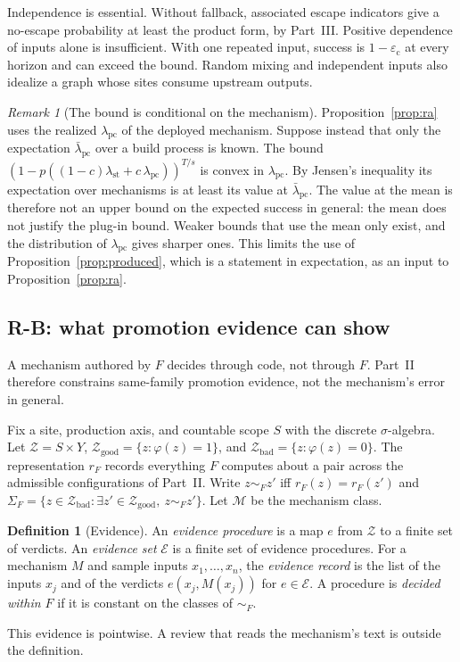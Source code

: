 \documentclass[11pt]{article}
\theoremstyle{definition}
\newtheorem{definition}{Definition}
\theoremstyle{remark}
\newtheorem{remark}{Remark}
\newcommand{\lst}{\lambda_{\mathrm{st}}}
\newcommand{\simF}{\sim_F}
\newcommand{\SigF}{\Sigma_F}
\newcommand{\lpc}{\lambda_{\mathrm{pc}}}
\newcommand{\ecl}{\varepsilon_{\mathrm{c}}}
\newcommand{\Z}{\mathcal{Z}}
\newcommand{\Zgood}{\mathcal{Z}_{\mathrm{good}}}
\newcommand{\Zbad}{\mathcal{Z}_{\mathrm{bad}}}
\newcommand{\Mclass}{\mathcal{M}}
\begin{document}
Independence is essential. Without fallback, associated escape indicators give a no-escape
probability at least the product form, by Part~III. Positive dependence of inputs alone is
insufficient. With one repeated input, success is $1-\ecl$ at every horizon and can exceed the
bound. Random mixing and independent inputs also idealize a graph whose sites consume upstream
outputs.

\begin{remark}[The bound is conditional on the mechanism]\label{rem:jensen}
Proposition~\ref{prop:ra} uses the realized $\lpc$ of the deployed mechanism. Suppose instead that
only the expectation $\bar\lambda_{\mathrm{pc}}$ over a build process is known. The bound
$(1-p((1-c)\lst+c\,\lpc))^{T/s}$ is convex in $\lpc$. By Jensen's inequality its expectation over
mechanisms is at least its value at $\bar\lambda_{\mathrm{pc}}$. The value at the mean is therefore
not an upper bound on the expected success in general: the mean does not justify the plug-in bound.
Weaker bounds that use the mean only exist, and the distribution of $\lpc$ gives sharper ones. This limits the use of Proposition~\ref{prop:produced},
which is a statement in expectation, as an input to Proposition~\ref{prop:ra}.
\end{remark}

\subsection{R-B: what promotion evidence can show}\label{sec:rb}
A mechanism authored by $F$ decides through code, not through $F$.
Part~II therefore constrains same-family promotion evidence, not the mechanism's error in general.

Fix a site, production axis, and countable scope $S$ with the discrete $\sigma$-algebra.
Let $\Z=S\times Y$, $\Zgood=\{z:\varphi(z)=1\}$, and $\Zbad=\{z:\varphi(z)=0\}$.
The representation $r_F$ records everything $F$ computes about a pair across the admissible
configurations of Part~II. Write $z\simF z'$ iff $r_F(z)=r_F(z')$ and
$\SigF=\{z\in\Zbad:\exists z'\in\Zgood,\ z\simF z'\}$.
Let $\Mclass$ be the mechanism class.

\begin{definition}[Evidence]\label{def:evproc}
An \emph{evidence procedure} is a map $e$ from $\Z$ to a finite set of verdicts. An \emph{evidence
set} $\mathcal{E}$ is a finite set of evidence procedures. For a mechanism $M$ and sample inputs
$x_1,\dots,x_n$, the \emph{evidence record} is the list of the inputs $x_j$ and of the verdicts
$e(x_j,M(x_j))$ for $e\in\mathcal{E}$. A procedure is \emph{decided within $F$} if it is constant on
the classes of $\simF$.
\end{definition}
This evidence is pointwise. A review that reads the mechanism's text is outside the definition.
\end{document}
